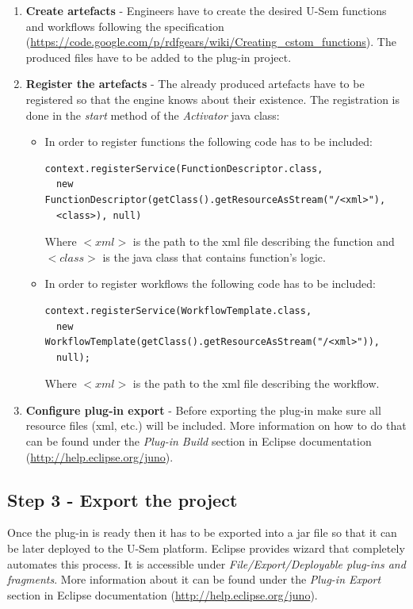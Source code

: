 \begin{enumerate}
	\item \textbf{Create artefacts} - Engineers have to create the desired U-Sem functions and workflows following the specification (\url{https://code.google.com/p/rdfgears/wiki/Creating_cstom_functions}). The produced files have to be added to the plug-in project.
	\item \textbf{Register the artefacts} - The already produced artefacts have to be registered so that the engine knows about their existence. The registration is done in the \textit{start} method of the \textit{Activator} java class:
	\begin{itemize}
	
		\item In order to register functions the following code has to be included:
		
\begin{lstlisting}
context.registerService(FunctionDescriptor.class, 
  new FunctionDescriptor(getClass().getResourceAsStream("/<xml>"), 
  <class>), null)
\end{lstlisting}

		Where \textit{$<xml>$} is the path to the xml file describing the function and \textit{$<class>$} is the java class that contains function's logic.
		
		\item In order to register workflows the following code has to be included: 
\begin{lstlisting}
context.registerService(WorkflowTemplate.class,
  new WorkflowTemplate(getClass().getResourceAsStream("/<xml>")),
  null);
\end{lstlisting}

		Where \textit{$<xml>$} is the path to the xml file describing the workflow.
		
	\end{itemize}
	\item \textbf{Configure plug-in export} -  Before exporting the plug-in make sure all resource files (xml, etc.) will be included. More information on how to do that can be found under the \textit{Plug-in Build} section in Eclipse documentation (\url{http://help.eclipse.org/juno}).
	
	
\end{enumerate}

\subsection{Step 3 - Export the project}
Once the plug-in is ready then it has to be exported into a jar file so that it can be later deployed to the U-Sem platform. Eclipse provides wizard that completely automates this process. It is accessible under \textit{File/Export/Deployable plug-ins and fragments}. More information about it can be found under the \textit{Plug-in Export} section in Eclipse documentation (\url{http://help.eclipse.org/juno}).

